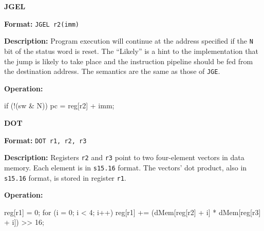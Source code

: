 \noindent\textsf{\textbf{\Large JGEL}}\par
{}\par\begin{indented}{\bf Format:}
{\tt JGEL r2(imm)}\par\vspace{3ex}
\end{indented}\vspace{4ex}
\begin{indented}{\bf Description:}
Program execution will continue at the address specified if the {\tt N} bit
of the status word is reset.  The ``Likely'' is a hint to the implementation
that the jump is likely to take place and the instruction pipeline should
be fed from the destination address.  The semantics are the same as those
of {\tt JGE}.
\end{indented}
\begin{indented}{\bf Operation:}\vspace{.8ex}
\begin{verbatimtab}
if (!(sw & N)) {
    pc = reg[r2] + imm;
}
\end{verbatimtab}
\end{indented}
\vspace{2em}

\newpage
{}
\noindent\textsf{\textbf{\Large DOT}}\par
{}\par\begin{indented}{\bf Format:}
{\tt DOT r1, r2, r3}\par\vspace{3ex}
\end{indented}\vspace{4ex}
\begin{indented}{\bf Description:}
Registers {\tt r2} and {\tt r3} point to two four-element vectors in data
memory.  Each element is in {\tt s15.16} format.  The vectors' dot product,
also in {\tt s15.16} format, is stored in register {\tt r1}.
\end{indented}
\begin{indented}{\bf Operation:}\vspace{.8ex}
\begin{verbatimtab}
reg[r1] = 0;
for (i = 0; i < 4; i++) {
    reg[r1] += (dMem[reg[r2] + i] * dMem[reg[r3] + i]) >> 16;
}
\end{verbatimtab}
\end{indented}
\vspace{2em}

